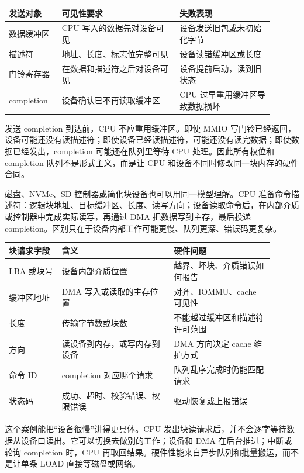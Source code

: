 \begin{longtable}{L{0.18\linewidth}L{0.4\linewidth}L{0.32\linewidth}}
\toprule
发送对象 & 可见性要求 & 失败表现 \\
\midrule
数据缓冲区 & CPU 写入的数据先对设备可见 & 设备发送旧包或未初始化字节 \\
描述符 & 地址、长度、标志位完整可见 & 设备读错缓冲区或长度 \\
门铃寄存器 & 在数据和描述符之后对设备可见 & 设备提前启动，读到旧状态 \\
completion & 设备确认已不再读取缓冲区 & CPU 过早重用缓冲区导致数据损坏 \\
\bottomrule
\end{longtable}

发送 completion 到达前，CPU 不应重用缓冲区。即使 MMIO 写门铃已经返回，设备可能还没有读描述符；即使设备已经读描述符，可能还没有读完数据；即使数据已经发出，completion 可能还在队列里等待 CPU 处理。因此所有权位和 completion 队列不是形式主义，而是让 CPU 和设备不同时修改同一块内存的硬件合同。

磁盘、NVMe、SD 控制器或简化块设备也可以用同一模型理解。CPU 准备命令描述符：逻辑块地址、目标缓冲区、长度、读写方向；设备读取命令后，在内部介质或控制器中完成实际读写，再通过 DMA 把数据写到主存，最后投递 completion。区别只在于设备内部工作可能更慢、队列更深、错误码更复杂。

\begin{longtable}{L{0.18\linewidth}L{0.38\linewidth}L{0.34\linewidth}}
\toprule
块请求字段 & 含义 & 硬件问题 \\
\midrule
LBA 或块号 & 设备内部介质位置 & 越界、坏块、介质错误如何报告 \\
缓冲区地址 & DMA 写入或读取的主存位置 & 对齐、IOMMU、cache 可见性 \\
长度 & 传输字节数或块数 & 不能越过缓冲区和描述符许可范围 \\
方向 & 读设备到内存，或写内存到设备 & DMA 方向决定 cache 维护方式 \\
命令 ID & completion 对应哪个请求 & 队列乱序完成时仍能匹配请求 \\
状态码 & 成功、超时、校验错误、权限错误 & 驱动恢复或上报错误 \\
\bottomrule
\end{longtable}

这个案例能把“设备很慢”讲得更具体。CPU 发出块读请求后，并不会逐字等待数据从设备口读出。它可以切换去做别的工作；设备和 DMA 在后台推进；中断或轮询 completion 时，CPU 再取回结果。硬件性能来自异步队列和批量搬运，而不是让单条 LOAD 直接等磁盘或网络。


